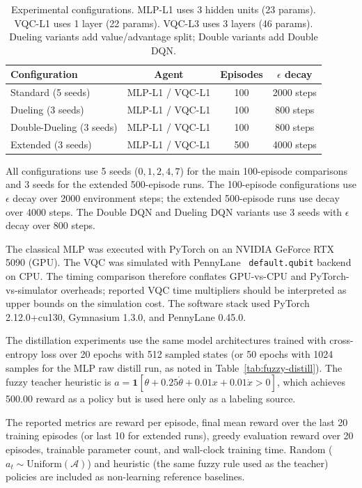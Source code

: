 \begin{table}[t]
  \centering
  \caption{Experimental configurations. MLP-L1 uses 3 hidden units (23 params). VQC-L1 uses 1 layer (22 params). VQC-L3 uses 3 layers (46 params). Dueling variants add value/advantage split; Double variants add Double DQN.}
  \label{tab:configs}
  \footnotesize
  \begin{tabular}{lccc}
    \hline
    Configuration & Agent & Episodes & $\epsilon$ decay \\
    \hline
    Standard (5 seeds) & MLP-L1 / VQC-L1 & 100 & 2000 steps \\
    Dueling (3 seeds) & MLP-L1 / VQC-L1 & 100 & 800 steps \\
    Double-Dueling (3 seeds) & MLP-L1 / VQC-L1 & 100 & 800 steps \\
    Extended (3 seeds) & MLP-L1 / VQC-L1 & 500 & 4000 steps \\
    \hline
  \end{tabular}
\end{table}

All configurations use 5 seeds ($0, 1, 2, 4, 7$) for the main 100-episode
comparisons and 3 seeds for the extended 500-episode runs. The 100-episode
configurations use $\epsilon$ decay over 2000 environment steps; the extended
500-episode runs use decay over 4000 steps. The Double DQN and Dueling DQN
variants use 3 seeds with $\epsilon$ decay over 800 steps.

The classical MLP was executed with PyTorch on an NVIDIA GeForce RTX 5090 (GPU).
The VQC was simulated with PennyLane~\cite{bergholm2018pennylane} \texttt{default.qubit} backend on CPU. The
timing comparison therefore conflates GPU-vs-CPU and PyTorch-vs-simulator
overheads; reported VQC time multipliers should be interpreted as upper bounds
on the simulation cost. The software stack used PyTorch 2.12.0+cu130,
Gymnasium 1.3.0, and PennyLane 0.45.0.

The distillation experiments use the same model architectures trained with
cross-entropy loss over 20 epochs with 512 sampled states (or 50 epochs with
1024 samples for the MLP raw distill run, as noted in Table~\ref{tab:fuzzy-distill}).
The fuzzy teacher heuristic is $a = \mathbf{1}[\theta + 0.25\dot{\theta}
+ 0.01x + 0.01\dot{x} > 0]$, which achieves 500.00 reward as a policy but is
used here only as a labeling source.

The reported metrics are reward per episode, final mean reward over the last 20
training episodes (or last 10 for extended runs), greedy evaluation reward over
20 episodes, trainable parameter count, and wall-clock training time. Random
($a_t \sim \text{Uniform}(\mathcal{A})$) and heuristic (the same fuzzy rule used
as the teacher) policies are included as non-learning reference baselines.

